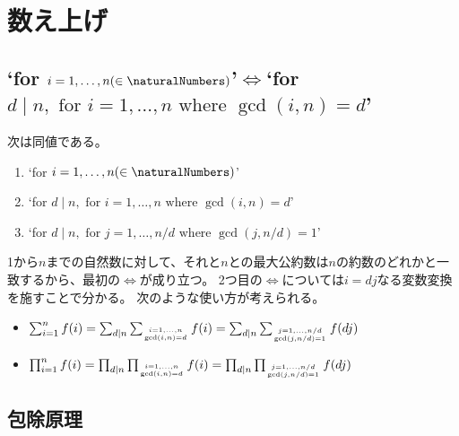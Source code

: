 \chapter{数え上げ}
    \section{\texorpdfstring{`for $i=1, \dotsc, n(\in \naturalNumbers)$'$\iff$`for $d \mid n, \text{ for } i=1,\dotsc,n \text{ where } \gcd(i,n)=d$'}{数え上げと最大公約数}}
        \begin{shadebox}
            次は同値である。
            \begin{enumerate}
                \item `for $i=1, \dotsc, n(\in \naturalNumbers)$'
                \item `for $d \mid n, \text{ for } i=1,\dotsc,n \text{ where } \gcd(i,n)=d$'
                \item `for $d \mid n, \text{ for } j=1,\dotsc,n/d \text{ where } \gcd(j,n/d)=1$'
            \end{enumerate}
        \end{shadebox}
        1から$n$までの自然数に対して、それと$n$との最大公約数は$n$の約数のどれかと一致するから、最初の$\iff$が成り立つ。
        2つ目の$\iff$については$i=dj$なる変数変換を施すことで分かる。
        次のような使い方が考えられる。
        \begin{itemize}
            \item $\sum_{i=1}^n f(i) = \sum_{d \mid n} \sum_{\genfrac{}{}{0pt}{}{i=1, \dotsc, n}{\gcd(i,n)=d}} f(i) = \sum_{d \mid n} \sum_{\genfrac{}{}{0pt}{}{j=1, \dotsc, n/d}{\gcd(j,n/d)=1}} f(dj)$
            \item $\prod_{i=1}^n f(i) = \prod_{d \mid n} \prod_{\genfrac{}{}{0pt}{}{i=1, \dotsc, n}{\gcd(i,n)=d}} f(i) = \prod_{d \mid n} \prod_{\genfrac{}{}{0pt}{}{j=1, \dotsc, n/d}{\gcd(j,n/d)=1}} f(dj)$
        \end{itemize}
    \section{包除原理}
